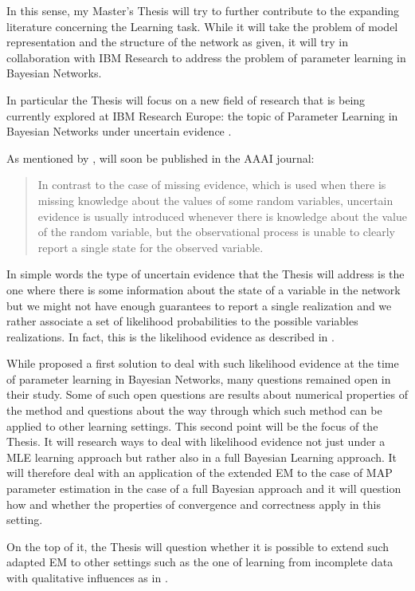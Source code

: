 \documentclass[a4paper]{article}
\begin{document}
In this sense, my Master's Thesis will try to further contribute to
the expanding literature concerning the Learning task. While it will take the
problem of model representation and the structure of the network as
given, it will try in collaboration with IBM Research to address the
problem of parameter learning in Bayesian Networks.

In particular the Thesis will focus on a new field of research that
is being currently explored at IBM Research Europe: the topic of
Parameter Learning in Bayesian Networks under uncertain evidence
\cite{Wasserkrug_all}.

As mentioned by \cite{Wasserkrug_all}, will soon
be published in the AAAI journal:

\begin{quote}
In contrast to the case of missing evidence, which is used when there
is missing knowledge about the values of some random variables,
uncertain evidence is usually introduced whenever there is knowledge
about the value of the random variable, but the observational
process is unable to clearly report a single state for the observed
variable.
\end{quote}


In simple words the type of uncertain evidence that the Thesis will
address is the one where there is some information about the state of
a variable in the network but we might not have enough guarantees to
report a single realization and we rather associate a set of
likelihood probabilities to the possible variables realizations. In
fact, this is the likelihood evidence as described in \cite{Mrad_2015}.

While \cite{Wasserkrug_all} proposed a first solution to deal with
such likelihood evidence at the time of parameter learning in
Bayesian Networks, many questions remained open in their study. Some
of such open questions are results about numerical properties of the
method and questions about the way through which such method can be
applied to other learning settings.  This second point will be the
focus of the Thesis. It will research ways to deal with likelihood
evidence not just under a MLE learning approach but rather also in a
full Bayesian Learning approach. It will therefore deal with an
application of the extended EM to the case of MAP parameter
estimation in the case of a full Bayesian approach and it will question
how and whether the properties of convergence and correctness
apply in this setting.

On the top of it, the Thesis will question whether it is possible
to extend such adapted EM to other settings such as the one of
learning from incomplete data with qualitative influences as in
\cite{Masegosa_2016}.
\end{document}
